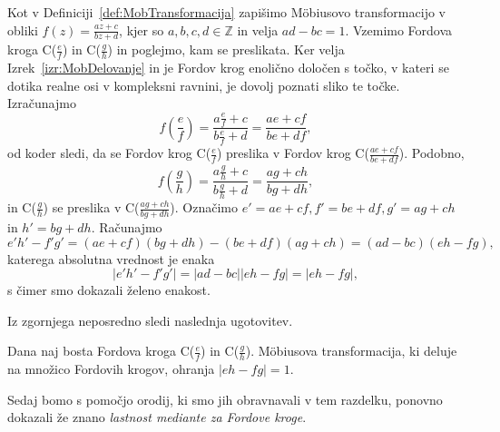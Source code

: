 \documentclass[mat1]{fmfdelo}
\begin{document}
\begin{dokaz}
Kot v Definiciji~\ref{def:MobTransformacija} zapišimo M\"{o}biusovo transformacijo v obliki $f(z) = \frac{az+c}{bz+d}$, kjer so $a,b,c,d \in \mathbb{Z}$ in velja $ad-bc=1$. 
Vzemimo Fordova kroga C($\frac{e}{f}$) in C($\frac{g}{h}$) in poglejmo, kam se preslikata. 
Ker velja Izrek~\ref{izr:MobDelovanje} in je Fordov krog enolično določen s točko, v kateri se dotika realne osi v kompleksni ravnini, je dovolj poznati sliko te točke.
Izračunajmo
\[ f \left(\frac{e}{f} \right) = \frac{a \frac{e}{f} + c}{b \frac{e}{f} + d} = \frac{ae + cf}{be + df}, \]
od koder sledi, da se Fordov krog C($\frac{e}{f}$) preslika v Fordov krog C($\frac{ae+cf}{be+df}$).
Podobno,
\[ f \left(\frac{g}{h} \right) = \frac{a \frac{g}{h} + c}{b \frac{g}{h} + d} = \frac{ag + ch}{bg + dh}, \]
in C($\frac{g}{h}$) se preslika v C($\frac{ag+ch}{bg+dh}$).
Označimo \( e' = ae+cf, f' = be+df, g' = ag+ch \) in $h' = bg+dh$. Računajmo
\[ e'h'-f'g' = (ae+cf)(bg+dh) - (be+df)(ag+ch) = (ad - bc)(eh - fg), \]
katerega absolutna vrednost je enaka
\[ |e'h'-f'g'| = |ad-bc| |eh-fg| = |eh-fg|, \]
s čimer smo dokazali želeno enakost.
\end{dokaz}

Iz zgornjega neposredno sledi naslednja ugotovitev.

\begin{posledica}
\label{Posl:MobOhr1}
Dana naj bosta Fordova kroga C($\frac{e}{f}$) in C($\frac{g}{h}$). M\"{o}biusova transformacija, ki deluje na množico Fordovih krogov, ohranja $|eh-fg|=1$.
\end{posledica}

Sedaj bomo s pomočjo orodij, ki smo jih obravnavali v tem razdelku, ponovno dokazali že znano \emph{lastnost mediante za Fordove kroge}.
\end{document}
